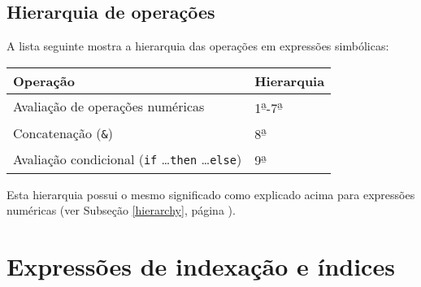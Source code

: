 \documentclass[11pt, brazil]{report}
\begin{document}

\subsection{Hierarquia de operações}

A lista seguinte mostra a hierarquia das operações em expressões
simbólicas:


\noindent\hfil
\begin{tabular}{@{}ll@{}}
Operação&Hierarquia\\
\hline
Avaliação de operações numéricas&
1{\textsuperscript{\b{a}}}-7{\textsuperscript{\b{a}}}\\
Concatenação ({\tt\&})&8{\textsuperscript{\b{a}}}\\
Avaliação condicional ({\tt if} \dots {\tt then} \dots {\tt else})&
9{\textsuperscript{\b{a}}}\\
\end{tabular}


Esta hierarquia possui o mesmo significado como explicado acima para
expressões numéricas (ver Subseção \ref{hierarchy}, página \pageref{hierarchy}).



\section{Expressões de indexação e índices}
\label{indexing}
\end{document}
